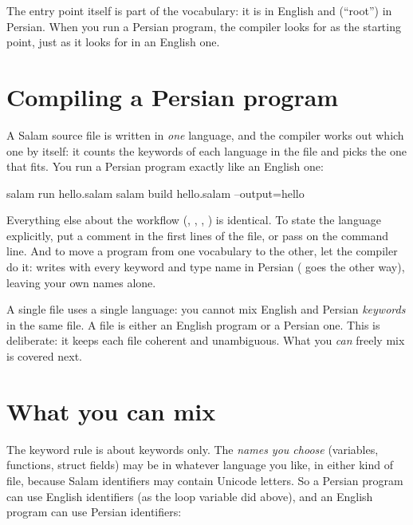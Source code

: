 \begin{note}
The entry point itself is part of the vocabulary: it is  in English and
 (``root'') in Persian. When you run a Persian program, the compiler
looks for  as the starting point, just as it looks for  in an
English one.
\end{note}

\section{Compiling a Persian program}

A Salam source file is written in \emph{one} language, and the compiler works out
which one by itself: it counts the keywords of each language in the file and picks
the one that fits. You run a Persian program exactly like an English one:

\begin{shell}
salam run hello.salam
salam build hello.salam --output=hello
\end{shell}

Everything else about the workflow (, , ,
) is identical. To state the language explicitly, put a
 comment in the first lines of the file, or pass
 on the command line. And to move a program from one vocabulary
to the other, let the compiler do it: 
writes  with every keyword and type name in Persian
( goes the other way), leaving your own names alone.

\begin{warn}
A single file uses a single language: you cannot mix English and Persian
\emph{keywords} in the same file. A file is either an English program or a Persian
one. This is deliberate: it keeps each
file coherent and unambiguous. What you \emph{can} freely mix is covered next.
\end{warn}

\section{What you can mix}

The keyword rule is about keywords only. The \emph{names you choose} (variables,
functions, struct fields) may be in whatever language you like, in either kind of
file, because Salam identifiers may contain Unicode letters. So a Persian program
can use English identifiers (as the loop variable  did above), and an
English program can use Persian identifiers:

